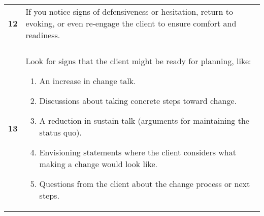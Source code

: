 \begin{tcolorbox}[breakable,
		fonttitle=\bfseries,
		fontupper=\small,
		title=Final \sysname Prompt]
\begin{tabularx}{\linewidth}{r X}
		\textbf{12} & If you notice signs of defensiveness or hesitation, return to evoking, or even re-engage the client to ensure comfort and readiness.                                                                                                                                                                                                                                                                  \\

		            &                                                                                                                                                                                                                                                                                                                                                                                                       \\[-12pt]

		\textbf{13} & Look for signs that the client might be ready for planning, like:
		\begin{enumerate}[itemsep=0pt, parsep=0pt]
			\item An increase in change talk.
			\item Discussions about taking concrete steps toward change.
			\item A reduction in sustain talk (arguments for maintaining the status quo).
			\item Envisioning statements where the client considers what making a change would look like.
			\item Questions from the client about the change process or next steps.
		\end{enumerate}

		\vspace{-16pt}
	\end{tabularx}
	\vspace{-16pt}

\end{tcolorbox}



\clearpage
